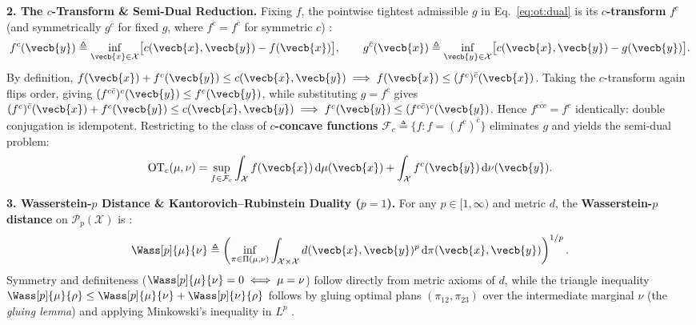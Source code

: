 \documentclass[../../../../master.tex]{subfiles}
\begin{document}
\begin{coremath}
\textbf{2. The $c$-Transform \& Semi-Dual Reduction.} Fixing $f$, the pointwise tightest admissible $g$ in Eq.~\eqref{eq:ot:dual} is its \textbf{$c$-transform} $f^c$ (and symmetrically $g^{\bar{c}}$ for fixed $g$, where $f^c = f^{\bar{c}}$ for symmetric $c$) :
\begin{equation}
\label{eq:ot:ctransform}
  f^c(\vecb{y}) \triangleq \inf_{\vecb{x} \in \mathcal{X}} \bigl[ c(\vecb{x}, \vecb{y}) - f(\vecb{x}) \bigr], \qquad
  g^{\bar{c}}(\vecb{x}) \triangleq \inf_{\vecb{y} \in \mathcal{X}} \bigl[ c(\vecb{x}, \vecb{y}) - g(\vecb{y}) \bigr].
\end{equation}
By definition, $f(\vecb{x}) + f^c(\vecb{y}) \le c(\vecb{x},\vecb{y}) \implies f(\vecb{x}) \le (f^c)^{\bar{c}}(\vecb{x})$. Taking the $c$-transform again flips order, giving $(f^{c\bar{c}})^c(\vecb{y}) \le f^c(\vecb{y})$, while substituting $g = f^c$ gives $(f^c)^{\bar{c}}(\vecb{x}) + f^c(\vecb{y}) \le c(\vecb{x},\vecb{y}) \implies f^c(\vecb{y}) \le (f^{c\bar{c}})^c(\vecb{y})$. Hence $f^{c\bar{c}c} = f^c$ identically: double conjugation is idempotent. Restricting to the class of \textbf{$c$-concave functions} $\mathcal{F}_c \triangleq \{ f : f = (f^c)^{\bar{c}} \}$ eliminates $g$ and yields the semi-dual problem:
\begin{equation}
\label{eq:ot:semidual}
  \mathrm{OT}_c(\mu, \nu) = \sup_{f \in \mathcal{F}_c} \int_{\mathcal{X}} f(\vecb{x})\,\mathrm{d}\mu(\vecb{x}) + \int_{\mathcal{X}} f^c(\vecb{y})\,\mathrm{d}\nu(\vecb{y}).
\end{equation}

\textbf{3. Wasserstein-$p$ Distance \& Kantorovich--Rubinstein Duality ($p = 1$).} For any $p \in [1, \infty)$ and metric $d$, the \textbf{Wasserstein-$p$ distance} on $\mathcal{P}_p(\mathcal{X})$ is :
\begin{equation}
\label{eq:ot:wasserstein_p}
  \Wass[p]{\mu}{\nu} \triangleq \left( \inf_{\pi \in \Pi(\mu, \nu)} \int_{\mathcal{X} \times \mathcal{X}} d(\vecb{x}, \vecb{y})^p\,\mathrm{d}\pi(\vecb{x}, \vecb{y}) \right)^{1/p}.
\end{equation}
Symmetry and definiteness ($\Wass[p]{\mu}{\nu} = 0 \iff \mu = \nu$) follow directly from metric axioms of $d$, while the triangle inequality $\Wass[p]{\mu}{\rho} \le \Wass[p]{\mu}{\nu} + \Wass[p]{\nu}{\rho}$ follows by gluing optimal plans $(\pi_{12}, \pi_{23})$ over the intermediate marginal $\nu$ (the \emph{gluing lemma}) and applying Minkowski's inequality in $L^p$ .


\end{coremath}
\end{document}
